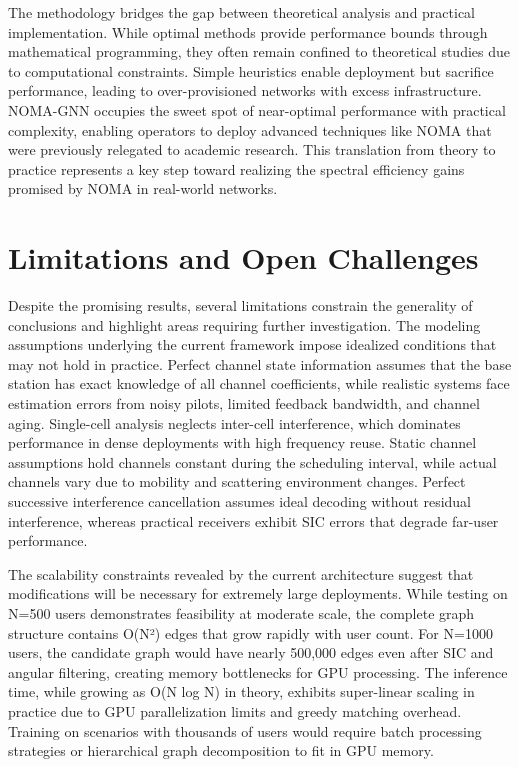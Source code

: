 The methodology bridges the gap between theoretical analysis and practical implementation. While optimal methods provide performance bounds through mathematical programming, they often remain confined to theoretical studies due to computational constraints. Simple heuristics enable deployment but sacrifice performance, leading to over-provisioned networks with excess infrastructure. NOMA-GNN occupies the sweet spot of near-optimal performance with practical complexity, enabling operators to deploy advanced techniques like NOMA that were previously relegated to academic research. This translation from theory to practice represents a key step toward realizing the spectral efficiency gains promised by NOMA in real-world networks.

\section{Limitations and Open Challenges}

Despite the promising results, several limitations constrain the generality of conclusions and highlight areas requiring further investigation. The modeling assumptions underlying the current framework impose idealized conditions that may not hold in practice. Perfect channel state information assumes that the base station has exact knowledge of all channel coefficients, while realistic systems face estimation errors from noisy pilots, limited feedback bandwidth, and channel aging. Single-cell analysis neglects inter-cell interference, which dominates performance in dense deployments with high frequency reuse. Static channel assumptions hold channels constant during the scheduling interval, while actual channels vary due to mobility and scattering environment changes. Perfect successive interference cancellation assumes ideal decoding without residual interference, whereas practical receivers exhibit SIC errors that degrade far-user performance.

The scalability constraints revealed by the current architecture suggest that modifications will be necessary for extremely large deployments. While testing on N=500 users demonstrates feasibility at moderate scale, the complete graph structure contains O(N²) edges that grow rapidly with user count. For N=1000 users, the candidate graph would have nearly 500,000 edges even after SIC and angular filtering, creating memory bottlenecks for GPU processing. The inference time, while growing as O(N log N) in theory, exhibits super-linear scaling in practice due to GPU parallelization limits and greedy matching overhead. Training on scenarios with thousands of users would require batch processing strategies or hierarchical graph decomposition to fit in GPU memory.

